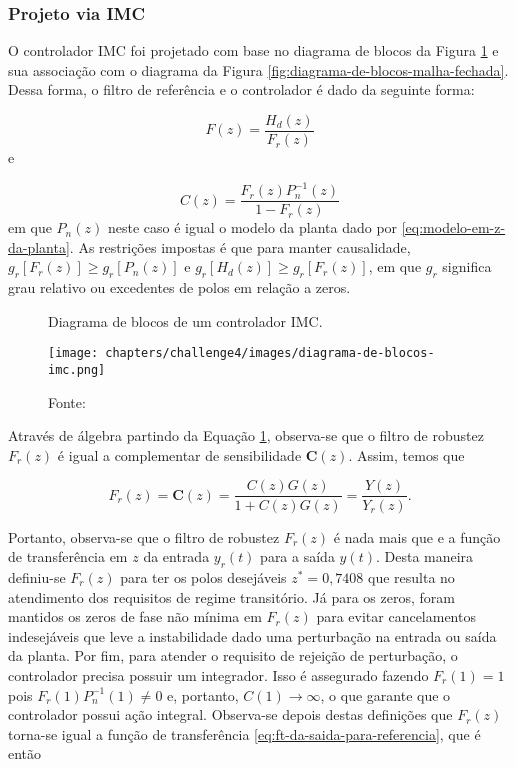 \subsubsection{Projeto via IMC}
\label{subsub:projeto-via-imc}

O controlador IMC foi projetado com base no diagrama de blocos da Figura
\ref{fig:diagrama-de-blocos-imc} e sua associação com o diagrama da Figura
\ref{fig:diagrama-de-blocos-malha-fechada}. Dessa forma, o filtro de referência
e o controlador é dado da seguinte forma:

\begin{equation}
    \label{eq:filtro-de-referencia-imc}
    F(z) = \frac{H_d(z)}{F_r(z)}
\end{equation} e

\begin{equation}
    \label{eq:controlador-imc}
    C(z) = \frac{F_r(z)P_{n}^{-1}(z)}{1-F_r(z)}
\end{equation} em que $P_n(z)$ neste caso é igual o modelo da planta dado por
\ref{eq:modelo-em-z-da-planta}. As restrições impostas é que para manter
causalidade, $g_r\left [ F_r(z) \right ] \geq g_r\left [ P_n(z) \right ]$ e
$g_r\left [ H_d(z) \right ] \geq g_r\left [ F_r(z) \right ]$, em que $g_r$
significa grau relativo ou excedentes de polos em relação a zeros.

\begin{figure}[ht!]
	\centering
	\caption{Diagrama de blocos de um controlador IMC.}
	\label{fig:diagrama-de-blocos-imc}
	\texttt{[image: chapters/challenge4/images/diagrama-de-blocos-imc.png]}
    \caption*{Fonte: \cite{Tito2021}}
\end{figure}

Através de álgebra partindo da Equação \ref{fig:diagrama-de-blocos-imc},
observa-se que o filtro de robustez $F_r(z)$ é igual a complementar de
sensibilidade $\boldsymbol{C}(z)$. Assim, temos que

\begin{equation}
    \label{eq:associacao-do-filtro-de-robustez}
    F_r(z) = \boldsymbol{C}(z) = \frac{C(z)G(z)}{1+C(z)G(z)} = \frac{Y(z)}{Y_{r}(z)}.
\end{equation}

Portanto, observa-se que o filtro de robustez $F_r(z)$ é nada mais que e a
função de transferência em $z$ da entrada $y_r(t)$ para a saída $y(t)$. Desta
maneira definiu-se $F_r(z)$ para ter os polos desejáveis $z^* = 0,7408$ que
resulta no atendimento dos requisitos de regime transitório. Já para os zeros,
foram mantidos os zeros de fase não mínima em $F_r(z)$ para evitar cancelamentos
indesejáveis que leve a instabilidade dado uma perturbação na entrada ou saída
da planta. Por fim, para atender o requisito de rejeição de perturbação, o
controlador precisa possuir um integrador. Isso é assegurado fazendo $F_r(1) =
1$ pois $F_r(1)P_{n}^{-1}(1) \neq 0$ e, portanto, $C(1) \rightarrow \infty$, o
que garante que o controlador possui ação integral. Observa-se depois destas
definições que $F_r(z)$ torna-se igual a função de transferência
\ref{eq:ft-da-saida-para-referencia}, que é então

